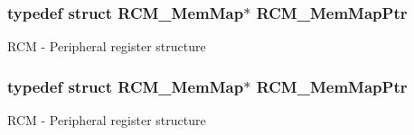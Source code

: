 \subsubsection[{\texorpdfstring{R\+C\+M\+\_\+\+Mem\+Map\+Ptr}{RCM_MemMapPtr}}]{\setlength{\rightskip}{0pt plus 5cm}typedef struct {\bf R\+C\+M\+\_\+\+Mem\+Map}$\ast$ {\bf R\+C\+M\+\_\+\+Mem\+Map\+Ptr}}\hypertarget{group___r_c_m___peripheral_ga787b1c58d947f0b81c2502227dd0396b}{}\label{group___r_c_m___peripheral_ga787b1c58d947f0b81c2502227dd0396b}
R\+CM -\/ Peripheral register structure 
\subsubsection[{\texorpdfstring{R\+C\+M\+\_\+\+Mem\+Map\+Ptr}{RCM_MemMapPtr}}]{\setlength{\rightskip}{0pt plus 5cm}typedef struct {\bf R\+C\+M\+\_\+\+Mem\+Map}$\ast$ {\bf R\+C\+M\+\_\+\+Mem\+Map\+Ptr}}\hypertarget{group___r_c_m___peripheral_ga787b1c58d947f0b81c2502227dd0396b}{}\label{group___r_c_m___peripheral_ga787b1c58d947f0b81c2502227dd0396b}
R\+CM -\/ Peripheral register structure 